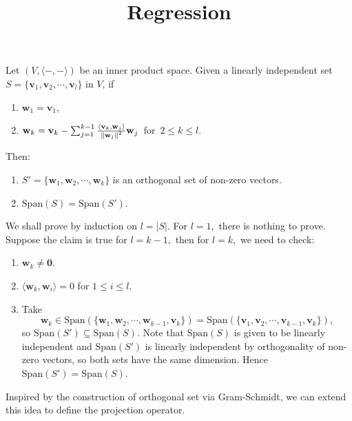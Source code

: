 \documentclass[12pt]{article}
\title{Regression}
\begin{document}
\maketitle

\begin{theorem}
    Let $(V,\langle-,-\rangle)$ be an inner product space. Given a linearly independent set $S=\{\mathbf{v}_1,\mathbf{v}_2,\cdots,\mathbf{v}_l\}$ in $V$, if
    \begin{enumerate}
        \item $\mathbf{w}_1=\mathbf{v}_1$,
        \item $\mathbf{w}_k=\mathbf{v}_k-\sum_{j=1}^{k-1}\frac{\langle \mathbf{v}_k, \mathbf{w}_j\rangle}{\left\lVert \mathbf{w}_j \right\rVert^2}\mathbf{w}_j\,$ for $\,2\le k\le l.$
    \end{enumerate} 
    Then:
    \begin{enumerate}
        \item $S'=\{\mathbf{w}_1,\mathbf{w}_2,\cdots,\mathbf{w}_k\}$ is an orthogonal set of non-zero vectors.
        \item $\mathrm{Span}(S)=\mathrm{Span}(S').$
    \end{enumerate}
\end{theorem}

\begin{pfbox}
    We shall prove by induction on $l=|S|.$
    For $l=1,$ there is nothing to prove. Suppose the claim is true for $l=k-1,$ then for $l=k,$
    we need to check:
    \begin{enumerate}
        \item $\mathbf{w}_k\neq \mathbf{0}.$
        \item $\langle \mathbf{w}_k, \mathbf{w}_i\rangle=0$ for $1\le i\le l$.
        \item Take 
        $$\mathbf{w}_k\in\mathrm{Span}(\{\mathbf{w}_1,\mathbf{w}_2,\cdots,\mathbf{w}_{k-1},\mathbf{v}_{k}\})=\mathrm{Span}(\{\mathbf{v}_1,\mathbf{v}_2,\cdots,\mathbf{v}_{k-1},\mathbf{v}_{k}\}),$$ 
        so $\mathrm{Span}(S')\subseteq\mathrm{Span}(S).$
        Note that $\mathrm{Span}(S)$ is given to be linearly independent and $\mathrm{Span}(S')$ is linearly independent by orthogonality of non-zero vectors, so both sets have the same dimension. Hence $\mathrm{Span}(S')=\mathrm{Span}(S).$
    \end{enumerate}
\end{pfbox}

Inspired by the construction of orthogonal set via Gram-Schmidt, we can extend this idea to define the projection operator.
\end{document}
